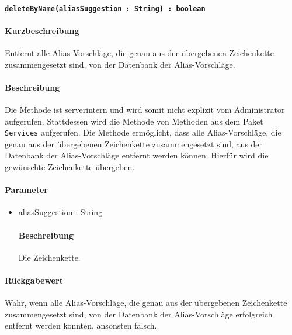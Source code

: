 \paragraph{\texttt{deleteByName(aliasSuggestion : String) : boolean}}%
\paragraph*{Kurzbeschreibung}
Entfernt alle Alias-Vorschläge, die genau aus der übergebenen Zeichenkette zusammengesetzt sind, von der Datenbank der Alias-Vorschläge.
\paragraph*{Beschreibung}
Die Methode ist serverintern und wird somit nicht explizit vom Administrator aufgerufen.
Stattdessen wird die Methode von Methoden aus dem Paket \texttt{Services} aufgerufen.
Die Methode ermöglicht, dass alle Alias-Vorschläge, die genau aus der übergebenen Zeichenkette zusammengesetzt sind, aus der Datenbank der Alias-Vorschläge entfernt werden können.
Hierfür wird die gewünschte Zeichenkette übergeben.
\paragraph*{Parameter}
\begin{itemize}
    \item aliasSuggestion : String
    		\paragraph*{Beschreibung}
    		Die Zeichenkette.
\end{itemize}
\paragraph*{Rückgabewert}
Wahr, wenn alle Alias-Vorschläge, die genau aus der übergebenen Zeichenkette zusammengesetzt sind, von der Datenbank der Alias-Vorschläge erfolgreich entfernt werden konnten, ansonsten falsch.
